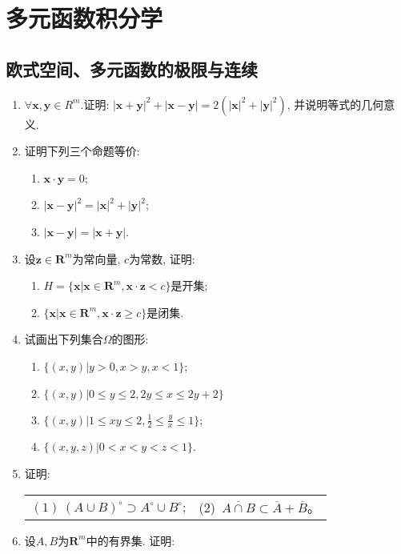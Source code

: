 \chapter{多元函数积分学}
\section{欧式空间、多元函数的极限与连续}
\begin{enumerate}
	\item $\forall \bm{x},\bm{y}\in R^m$.证明: $|\bm{x}+\bm{y}|^2+|\bm{x}-\bm{y}|=2(|\bm{x}|^2+|\bm{y}|^2)$, 并说明等式的几何意义.
	\item 证明下列三个命题等价:
	\begin{enumerate}
		\item $\bm{x\cdot y}=0$;
		\item $|\bm{x-y}|^2=|\bm{x}|^2+|\bm{y}|^2$;
		\item $|\bm{x}-\bm{y}|=|\bm{x}+\bm{y}|$.
	\end{enumerate}
	\item 设$\bm{z}\in \bm{R}^m$为常向量, $c$为常数, 证明:
	\begin{enumerate}
	\item 	$H=\{\bm{x}|\bm{x}\in \bm{R}^m, \bm{x}\cdot \bm{z}<c\}$是开集;
	\item $\{\bm{x}|\bm{x}\in \bm{R}^m, \bm{x}\cdot \bm{z}\ge c\}$是闭集.
	\end{enumerate}
	\item 试画出下列集合$\Omega$的图形:
	\begin{enumerate}
		\item $\{(x,y)|y>0,x>y,x<1\}$;
		\item $\{(x,y)|0\le y\le 2 ,2y\le x\le 2y+2 \}$
		\item $\{(x,y)|1\le xy \le 2,\frac{1}{2}\le \frac{y}{x}\le 1\}$;
		\item $\{(x,y,z)|0<x<y<z<1\}$.
	\end{enumerate} 
	\item 证明:
	\begin{table}[H]
		\begin{tabular}{ll}
			$(1)\ (A\cup B)^\circ \supset A^\circ\cup B^\circ$;\qquad \qquad \qquad \qquad \qquad&(2)\ $\overline{A\cap B}\subset \overline{A}+\overline{B}$。
		\end{tabular}
	\end{table}
 	\item 设$A,B$为$\bm{R}^m$中的有界集. 证明:
 	\begin{table}[H]

\end{table}
\end{enumerate}
